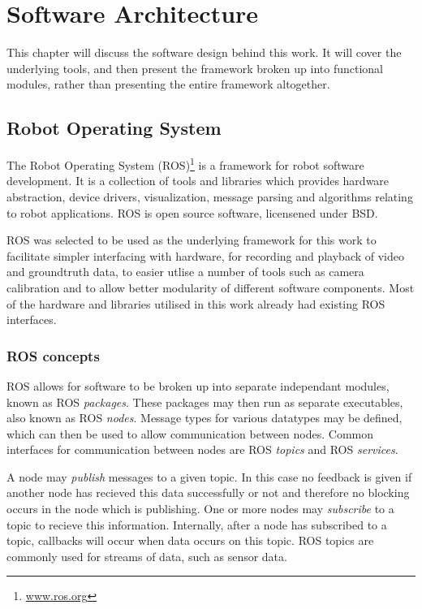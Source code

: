 \chapter{Software Architecture}
\label{chapter:architecture}

This chapter will discuss the software design behind this work.  It will cover the underlying tools, and then present the framework broken up into functional modules, rather than presenting the entire framework altogether.

\section{Robot Operating System}

The Robot Operating System (ROS)\footnote{\url{www.ros.org}} is a framework for robot software development.  It is a collection of tools and libraries which provides hardware abstraction, device drivers, visualization, message parsing and algorithms relating to robot applications.  ROS is open source software, licensened under BSD.

ROS was selected to be used as the underlying framework for this work to facilitate simpler interfacing with hardware, for recording and playback of video and groundtruth data, to easier utlise a number of tools such as camera calibration and to allow better modularity of different software components.  Most of the hardware and libraries utilised in this work already had existing ROS interfaces.

\subsection{ROS concepts}

ROS allows for software to be broken up into separate independant modules, known as ROS \textit{packages}.  These packages may then run as separate executables, also known as ROS \textit{nodes}.  Message types for various datatypes may be defined, which can then be used to allow communication between nodes.  Common interfaces for communication between nodes are ROS \textit{topics} and ROS \textit{services}.

A node may \textit{publish} messages to a given topic.  In this case no feedback is given if another node has recieved this data successfully or not and therefore no blocking occurs in the node which is publishing.  One or more nodes may \textit{subscribe} to a topic to recieve this information.  Internally, after a node has subscribed to a topic, callbacks will occur when data occurs on this topic.  ROS topics are commonly used for streams of data, such as sensor data.

